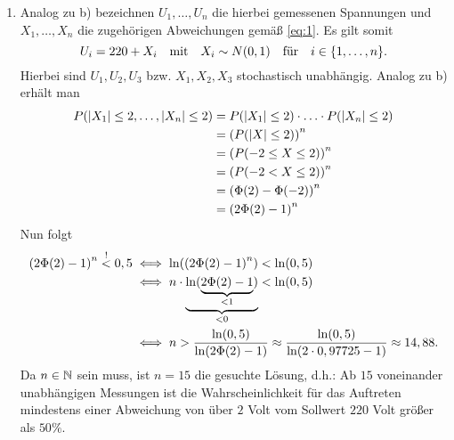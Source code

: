 \documentclass{exercise}
\begin{document}
\begin{enumerate}
        \item Analog zu b) bezeichnen \(U_1, \ldots, U_n\) die hierbei gemessenen Spannungen und \(X_1, \ldots, X_n\) die zugehörigen Abweichungen gemäß \eqref{eq:1}.
        Es gilt somit
        \[
            U_i = 220 + X_i \quad \text{mit} \quad X_i \sim N\parentheses*{0, 1} \quad \text{für} \quad i \in \braces*{1, \ldots, n}.
        \]
        Hierbei sind \(U_1, U_2, U_3\) bzw. \(X_1, X_2, X_3\) stochastisch unabhängig.
        Analog zu b) erhält man
        \begin{align*}
            P\parentheses*{\absolute*{X_1} \le 2, \ldots, \absolute*{X_n} \le 2} &= P\parentheses*{\absolute*{X_1} \le 2} \cdot \ldots \cdot P\parentheses*{\absolute*{X_n} \le 2}\\
            &= \parentheses*{P\parentheses*{\absolute*{X} \le 2}}^n\\
            &= \parentheses*{P\parentheses*{-2 \le X \le 2}}^n\\
            &= \parentheses*{P\parentheses*{-2 < X \le 2}}^n\\
            &= \parentheses*{\Phi\parentheses*{2} - \Phi\parentheses*{-2}}^n\\
            &= \parentheses*{2\Phi\parentheses*{2} - 1}^n
        \end{align*}
        Nun folgt
        \begin{align*}
            \parentheses*{2\Phi\parentheses*{2} - 1}^n \stackrel{!}{<} 0,5 &\iff \ln\parentheses*{\parentheses*{2\Phi\parentheses*{2} - 1}^n} < \ln\parentheses*{0,5}\\
            &\iff n \cdot \underbrace{\ln(\underbrace{2\Phi\parentheses*{2} - 1}_{< 1})}_{< 0} < \ln\parentheses*{0,5}\\
            &\iff n > \frac{\ln\parentheses*{0,5}}{\ln\parentheses*{2\Phi\parentheses*{2} - 1}} \approx \frac{\ln\parentheses*{0,5}}{\ln\parentheses*{2 \cdot 0,97725 - 1}} \approx 14,88.
        \end{align*}
        Da \(n \in \mathbb{N}\) sein muss, ist \(n = 15\) die gesuchte Lösung, d.h.: Ab \(15\) voneinander unabhängigen Messungen ist die Wahrscheinlichkeit für das Auftreten mindestens einer Abweichung von über \(2\) Volt vom Sollwert \(220\) Volt größer als \(50\%\).
    \end{enumerate}
\end{document}
